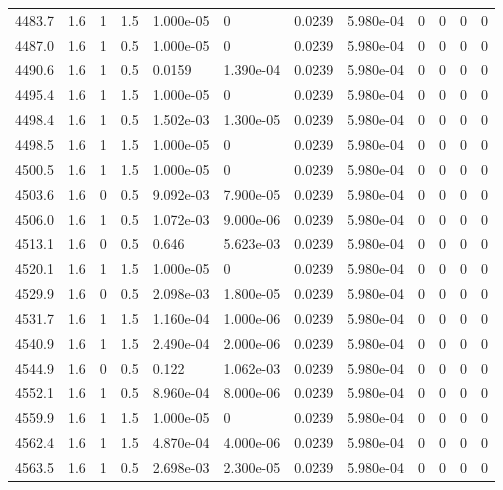 \documentclass[preview]{standalone}
\begin{document}
{{{{{{{{{{{{{{{{{{\begin{tabular}{L{1.2cm}C{1.2cm} C{0.3cm}C{0.5cm} C{1.4cm}C{1.4cm} C{1.4cm}C{1.4cm} C{1.6cm}C{1.6cm} C{1.6cm}C{1.6cm}}
  4483.7  &   1.6  & 1     & 1.5 &  1.000e-05  & 0  &  0.0239&   5.980e-04& 0 & 0   &  0 & 0  \\ 
  4487.0  &   1.6  & 1     & 0.5 &  1.000e-05  & 0  &  0.0239&   5.980e-04& 0 & 0   &  0 & 0  \\ 
  4490.6  &   1.6  & 1     & 0.5 &  0.0159  & 1.390e-04  &  0.0239&   5.980e-04& 0 & 0   &  0 & 0  \\ 
  4495.4  &   1.6  & 1     & 1.5 &  1.000e-05  & 0  &  0.0239&   5.980e-04& 0 & 0   &  0 & 0  \\ 
  4498.4  &   1.6  & 1     & 0.5 &  1.502e-03  & 1.300e-05  &  0.0239&   5.980e-04& 0 & 0   &  0 & 0  \\ 
  4498.5  &   1.6  & 1     & 1.5 &  1.000e-05  & 0  &  0.0239&   5.980e-04& 0 & 0   &  0 & 0  \\ 
  4500.5  &   1.6  & 1     & 1.5 &  1.000e-05  & 0  &  0.0239&   5.980e-04& 0 & 0   &  0 & 0  \\ 
  4503.6  &   1.6  & 0     & 0.5 &  9.092e-03  & 7.900e-05  &  0.0239&   5.980e-04& 0 & 0   &  0 & 0  \\ 
  4506.0  &   1.6  & 1     & 0.5 &  1.072e-03  & 9.000e-06  &  0.0239&   5.980e-04& 0 & 0   &  0 & 0  \\ 
  4513.1  &   1.6  & 0     & 0.5 &  0.646  & 5.623e-03  &  0.0239&   5.980e-04& 0 & 0   &  0 & 0  \\ 
  4520.1  &   1.6  & 1     & 1.5 &  1.000e-05  & 0  &  0.0239&   5.980e-04& 0 & 0   &  0 & 0  \\ 
  4529.9  &   1.6  & 0     & 0.5 &  2.098e-03  & 1.800e-05  &  0.0239&   5.980e-04& 0 & 0   &  0 & 0  \\ 
  4531.7  &   1.6  & 1     & 1.5 &  1.160e-04  & 1.000e-06  &  0.0239&   5.980e-04& 0 & 0   &  0 & 0  \\ 
  4540.9  &   1.6  & 1     & 1.5 &  2.490e-04  & 2.000e-06  &  0.0239&   5.980e-04& 0 & 0   &  0 & 0  \\ 
  4544.9  &   1.6  & 0     & 0.5 &  0.122  & 1.062e-03  &  0.0239&   5.980e-04& 0 & 0   &  0 & 0  \\ 
  4552.1  &   1.6  & 1     & 0.5 &  8.960e-04  & 8.000e-06  &  0.0239&   5.980e-04& 0 & 0   &  0 & 0  \\ 
  4559.9  &   1.6  & 1     & 1.5 &  1.000e-05  & 0  &  0.0239&   5.980e-04& 0 & 0   &  0 & 0  \\ 
  4562.4  &   1.6  & 1     & 1.5 &  4.870e-04  & 4.000e-06  &  0.0239&   5.980e-04& 0 & 0   &  0 & 0  \\ 
  4563.5  &   1.6  & 1     & 0.5 &  2.698e-03  & 2.300e-05  &  0.0239&   5.980e-04& 0 & 0   &  0 & 0  \\ 

\end{tabular}}}}}}}}}}}}}}}}}}}
\end{document}

